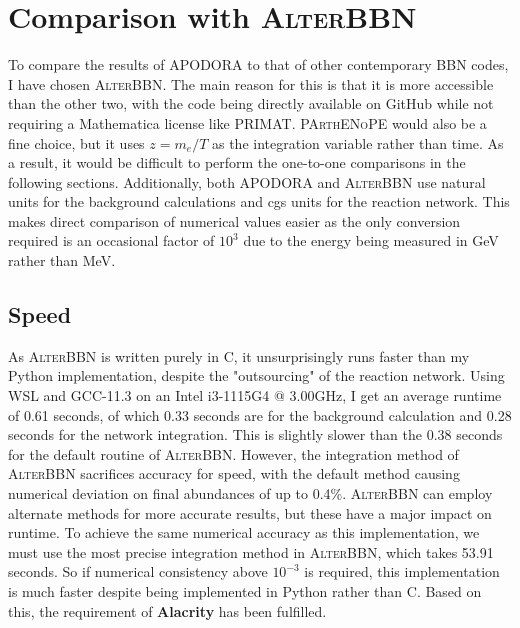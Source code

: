 \section{Comparison with \textsc{AlterBBN}}
\label{sec:Altercompare}
To compare the results of APODORA to that of other contemporary BBN codes, I have chosen \textsc{AlterBBN}. The main reason for this is that it is more accessible than the other two, with the code being directly available on GitHub while not requiring a Mathematica license like PRIMAT. 
\textsc{PArthENoPE} would also be a fine choice, but it uses $z=m_e/T$ as the integration variable rather than time. As a result, it would be difficult to perform the one-to-one comparisons in the following sections.
Additionally, both APODORA and \textsc{AlterBBN} use natural units for the background calculations and cgs units for the reaction network. This makes direct comparison of numerical values easier as the only conversion required is an occasional factor of $10^3$ due to the energy being measured in GeV rather than MeV. 

\subsection{Speed}
As \textsc{AlterBBN} is written purely in C, it unsurprisingly runs faster than my Python implementation, despite the "outsourcing" of the reaction network. Using WSL and GCC-11.3 on an Intel i3-1115G4 @ 3.00GHz, I get an average runtime of 0.61 seconds, of which 0.33 seconds are for the background calculation and 0.28 seconds for the network integration. This is slightly slower than the 0.38 seconds for the default routine of \textsc{AlterBBN}. However, the integration method of \textsc{AlterBBN} sacrifices accuracy for speed, with the default method causing numerical deviation on final abundances of up to 0.4\%. \textsc{AlterBBN} can employ alternate methods for more accurate results, but these have a major impact on runtime. To achieve the same numerical accuracy as this implementation, we must use the most precise integration method in \textsc{AlterBBN}, which takes 53.91 seconds. So if numerical consistency above $10^{-3}$ is required, this implementation is much faster despite being implemented in Python rather than C.  Based on this, the requirement of \textbf{Alacrity} has been fulfilled.

